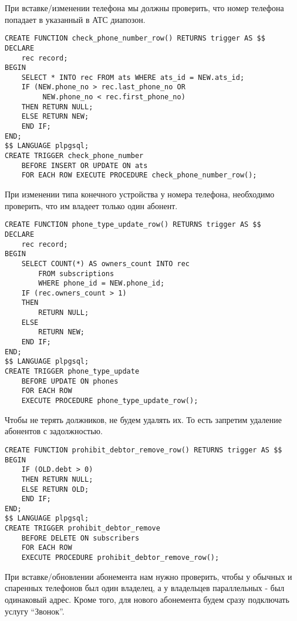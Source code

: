 \documentclass{report}
\begin{document}
При вставке/изменении телефона мы должны проверить, 
что номер телефона попадает в указанный в АТС диапозон.

\begin{lstlisting}
CREATE FUNCTION check_phone_number_row() RETURNS trigger AS $$
DECLARE
    rec record;
BEGIN
    SELECT * INTO rec FROM ats WHERE ats_id = NEW.ats_id;
    IF (NEW.phone_no > rec.last_phone_no OR
         NEW.phone_no < rec.first_phone_no)
    THEN RETURN NULL;
    ELSE RETURN NEW;
    END IF;
END;
$$ LANGUAGE plpgsql;
CREATE TRIGGER check_phone_number 
    BEFORE INSERT OR UPDATE ON ats
    FOR EACH ROW EXECUTE PROCEDURE check_phone_number_row();
\end{lstlisting}

При изменении типа конечного устройства у номера телефона, необходимо проверить,
что им владеет только один абонент.

\begin{lstlisting}
CREATE FUNCTION phone_type_update_row() RETURNS trigger AS $$
DECLARE
    rec record;
BEGIN
    SELECT COUNT(*) AS owners_count INTO rec 
        FROM subscriptions
        WHERE phone_id = NEW.phone_id;
    IF (rec.owners_count > 1)
    THEN
        RETURN NULL;
    ELSE
        RETURN NEW;
    END IF;
END;
$$ LANGUAGE plpgsql;
CREATE TRIGGER phone_type_update 
    BEFORE UPDATE ON phones
    FOR EACH ROW 
    EXECUTE PROCEDURE phone_type_update_row();
\end{lstlisting}

Чтобы не терять должников, не будем удалять их. То есть запретим
удаление абонентов с задолжностью.

\begin{lstlisting}
CREATE FUNCTION prohibit_debtor_remove_row() RETURNS trigger AS $$
BEGIN
    IF (OLD.debt > 0)
    THEN RETURN NULL;
    ELSE RETURN OLD;
    END IF;
END;
$$ LANGUAGE plpgsql;
CREATE TRIGGER prohibit_debtor_remove 
    BEFORE DELETE ON subscribers
    FOR EACH ROW 
    EXECUTE PROCEDURE prohibit_debtor_remove_row();
\end{lstlisting}

При вставке/обновлении абонемента нам нужно проверить, чтобы у
обычных и спаренных телефонов был один владелец, а у владельцев
параллельных - был одинаковый адрес. Кроме того, для нового абонемента
будем сразу подключать услугу ``Звонок''.
\end{document}
